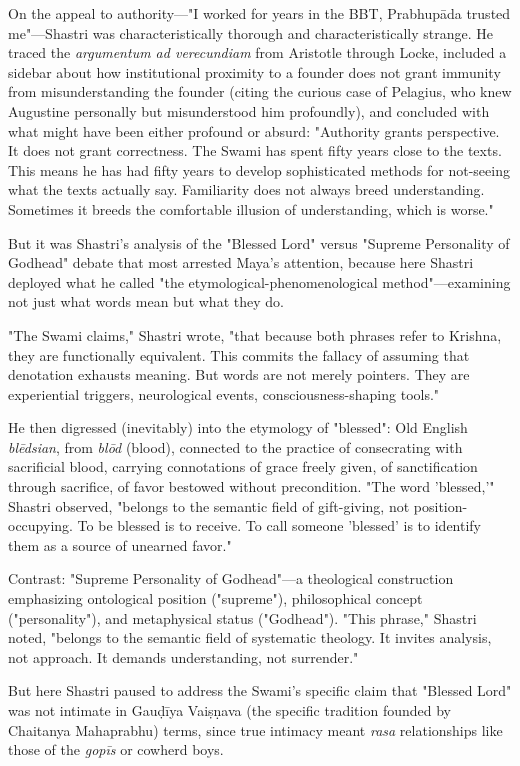 \documentclass[12pt,twoside]{book}
\begin{document}
On the appeal to authority—"I worked for years in the BBT, Prabhupāda trusted me"—Shastri was characteristically thorough and characteristically strange. He traced the \emph{argumentum ad verecundiam} from Aristotle through Locke, included a sidebar about how institutional proximity to a founder does not grant immunity from misunderstanding the founder (citing the curious case of Pelagius, who knew Augustine personally but misunderstood him profoundly), and concluded with what might have been either profound or absurd: "Authority grants perspective. It does not grant correctness. The Swami has spent fifty years close to the texts. This means he has had fifty years to develop sophisticated methods for not-seeing what the texts actually say. Familiarity does not always breed understanding. Sometimes it breeds the comfortable illusion of understanding, which is worse."

But it was Shastri's analysis of the "Blessed Lord" versus "Supreme Personality of Godhead" debate that most arrested Maya's attention, because here Shastri deployed what he called "the etymological-phenomenological method"—examining not just what words mean but what they do.

"The Swami claims," Shastri wrote, "that because both phrases refer to Krishna, they are functionally equivalent. This commits the fallacy of assuming that denotation exhausts meaning. But words are not merely pointers. They are experiential triggers, neurological events, consciousness-shaping tools."

He then digressed (inevitably) into the etymology of "blessed": Old English \emph{blēdsian}, from \emph{blōd} (blood), connected to the practice of consecrating with sacrificial blood, carrying connotations of grace freely given, of sanctification through sacrifice, of favor bestowed without precondition. "The word 'blessed,'" Shastri observed, "belongs to the semantic field of gift-giving, not position-occupying. To be blessed is to receive. To call someone 'blessed' is to identify them as a source of unearned favor."

Contrast: "Supreme Personality of Godhead"—a theological construction emphasizing ontological position ("supreme"), philosophical concept ("personality"), and metaphysical status ("Godhead"). "This phrase," Shastri noted, "belongs to the semantic field of systematic theology. It invites analysis, not approach. It demands understanding, not surrender."

But here Shastri paused to address the Swami's specific claim that "Blessed Lord" was not intimate in Gauḍīya Vaiṣṇava (the specific tradition founded by Chaitanya Mahaprabhu) terms, since true intimacy meant \emph{rasa} relationships like those of the \emph{gopīs} or cowherd boys.
\end{document}
